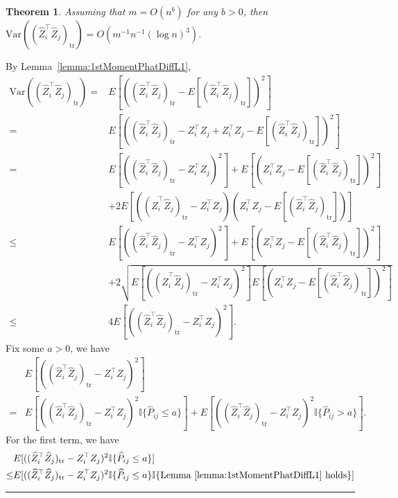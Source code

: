 \documentclass[a4paper]{article}
\newenvironment{proof}{{\bf Proof:  }}{\hfill\rule{2mm}{2mm}}
\newtheorem{theorem}[fact]{Theorem}
\renewcommand{\hat}{\widehat}
\begin{document}
\begin{theorem}
\label{thm:VarASEL1proof}
Assuming that $m = O(n^b)$ for any $b > 0$, then $\mathrm{Var}((\hat{Z}_i^{\top} \hat{Z}_j)_{\mathrm{tr}}) = O(m^{-1} n^{-1} (\log n)^3)$.
\end{theorem}
\begin{proof}
By Lemma~\ref{lemma:1stMomentPhatDiffL1},
\begin{align*}
	\mathrm{Var}((\hat{Z}_i^{\top} \hat{Z}_j)_{\mathrm{tr}})
    = & E[((\hat{Z}_i^{\top} \hat{Z}_j)_{\mathrm{tr}} - E[(\hat{Z}_i^{\top} \hat{Z}_j)_{\mathrm{tr}}])^2] \\
    = & E[((\hat{Z}_i^{\top} \hat{Z}_j)_{\mathrm{tr}} - Z_i^{\top} Z_j + Z_i^{\top} Z_j - E[(\hat{Z}_i^{\top} \hat{Z}_j)_{\mathrm{tr}}])^2] \\
    = & E[((\hat{Z}_i^{\top} \hat{Z}_j)_{\mathrm{tr}} - Z_i^{\top} Z_j)^2] + E[(Z_i^{\top} Z_j - E[(\hat{Z}_i^{\top} \hat{Z}_j)_{\mathrm{tr}}])^2] \\ 
    & + 2E[((\hat{Z}_i^{\top} \hat{Z}_j)_{\mathrm{tr}} - Z_i^{\top} Z_j)(Z_i^{\top} Z_j - E[(\hat{Z}_i^{\top} \hat{Z}_j)_{\mathrm{tr}}])] \\
    \le & E[((\hat{Z}_i^{\top} \hat{Z}_j)_{\mathrm{tr}} - Z_i^{\top} Z_j)^2] + E[(Z_i^{\top} Z_j - E[(\hat{Z}_i^{\top} \hat{Z}_j)_{\mathrm{tr}}])^2] \\ 
    & + 2\sqrt{E[((\hat{Z}_i^{\top} \hat{Z}_j)_{\mathrm{tr}} - Z_i^{\top} Z_j)^2] E[(Z_i^{\top} Z_j - E[(\hat{Z}_i^{\top} \hat{Z}_j)_{\mathrm{tr}}])^2]} \\
    \le & 4 E[((\hat{Z}_i^{\top} \hat{Z}_j)_{\mathrm{tr}} - Z_i^{\top} Z_j)^2].
\end{align*}
Fix some $a > 0$, we have
\begin{align*}
	& E[((\hat{Z}_i^{\top} \hat{Z}_j)_{\mathrm{tr}} - Z_i^{\top} Z_j)^2] \\
	= & E[((\hat{Z}_i^{\top} \hat{Z}_j)_{\mathrm{tr}} - Z_i^{\top} Z_j)^2 \mathbb{I}\{\hat{P}_{ij} \le a\}]
	+ E[((\hat{Z}_i^{\top} \hat{Z}_j)_{\mathrm{tr}} - Z_i^{\top} Z_j)^2 \mathbb{I}\{\hat{P}_{ij} > a\}].
\end{align*}
For the first term, we have
\begin{align*}
	& E[((\hat{Z}_i^{\top} \hat{Z}_j)_{\mathrm{tr}} - Z_i^{\top} Z_j)^2 \mathbb{I}\{\hat{P}_{ij} \le a\}] \\
	\le & E[((\hat{Z}_i^{\top} \hat{Z}_j)_{\mathrm{tr}} - Z_i^{\top} Z_j)^2 \mathbb{I}\{\hat{P}_{ij} \le a\} \mathbb{I}\{\mathrm{Lemma\ } \ref{lemma:1stMomentPhatDiffL1} \mathrm{\ holds}\}] \\

\end{align*}
\end{proof}
\end{document}

